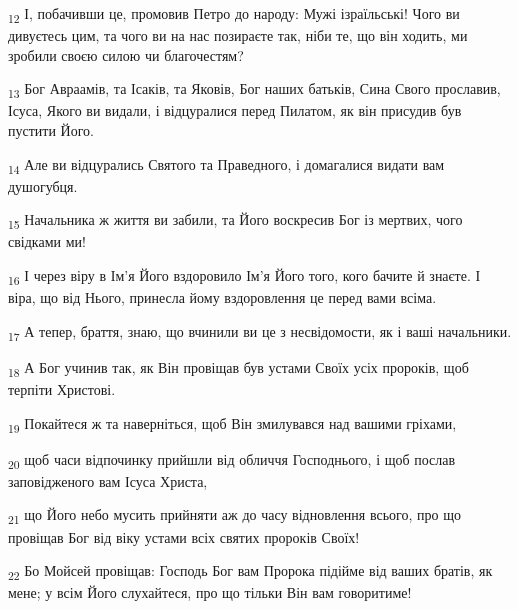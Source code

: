 \begin{tcolorbox}
\textsubscript{12} І, побачивши це, промовив Петро до народу: Мужі ізраїльські! Чого ви дивуєтесь цим, та чого ви на нас позираєте так, ніби те, що він ходить, ми зробили своєю силою чи благочестям?
\end{tcolorbox}
\begin{tcolorbox}
\textsubscript{13} Бог Авраамів, та Ісаків, та Яковів, Бог наших батьків, Сина Свого прославив, Ісуса, Якого ви видали, і відцуралися перед Пилатом, як він присудив був пустити Його.
\end{tcolorbox}
\begin{tcolorbox}
\textsubscript{14} Але ви відцурались Святого та Праведного, і домагалися видати вам душогубця.
\end{tcolorbox}
\begin{tcolorbox}
\textsubscript{15} Начальника ж життя ви забили, та Його воскресив Бог із мертвих, чого свідками ми!
\end{tcolorbox}
\begin{tcolorbox}
\textsubscript{16} І через віру в Ім'я Його вздоровило Ім'я Його того, кого бачите й знаєте. І віра, що від Нього, принесла йому вздоровлення це перед вами всіма.
\end{tcolorbox}
\begin{tcolorbox}
\textsubscript{17} А тепер, браття, знаю, що вчинили ви це з несвідомости, як і ваші начальники.
\end{tcolorbox}
\begin{tcolorbox}
\textsubscript{18} А Бог учинив так, як Він провіщав був устами Своїх усіх пророків, щоб терпіти Христові.
\end{tcolorbox}
\begin{tcolorbox}
\textsubscript{19} Покайтеся ж та наверніться, щоб Він змилувався над вашими гріхами,
\end{tcolorbox}
\begin{tcolorbox}
\textsubscript{20} щоб часи відпочинку прийшли від обличчя Господнього, і щоб послав заповідженого вам Ісуса Христа,
\end{tcolorbox}
\begin{tcolorbox}
\textsubscript{21} що Його небо мусить прийняти аж до часу відновлення всього, про що провіщав Бог від віку устами всіх святих пророків Своїх!
\end{tcolorbox}
\begin{tcolorbox}
\textsubscript{22} Бо Мойсей провіщав: Господь Бог вам Пророка підійме від ваших братів, як мене; у всім Його слухайтеся, про що тільки Він вам говоритиме!
\end{tcolorbox}
